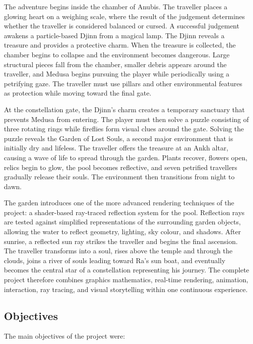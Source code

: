 \documentclass[11pt,a4paper]{article}
\begin{document}
The adventure begins inside the chamber of Anubis. The traveller places a
glowing heart on a weighing scale, where the result of the judgement determines
whether the traveller is considered balanced or cursed. A successful judgement
awakens a particle-based Djinn from a magical lamp. The Djinn reveals a
treasure and provides a protective charm. When the treasure is collected, the
chamber begins to collapse and the environment becomes dangerous. Large
structural pieces fall from the chamber, smaller debris appears around the
traveller, and Medusa begins pursuing the player while periodically using a
petrifying gaze. The traveller must use pillars and other environmental
features as protection while moving toward the final gate.

At the constellation gate, the Djinn's charm creates a temporary sanctuary
that prevents Medusa from entering. The player must then solve a puzzle
consisting of three rotating rings while fireflies form visual clues around the
gate. Solving the puzzle reveals the Garden of Lost Souls, a second major
environment that is initially dry and lifeless. The traveller offers the
treasure at an Ankh altar, causing a wave of life to spread through the garden.
Plants recover, flowers open, relics begin to glow, the pool becomes reflective,
and seven petrified travellers gradually release their souls. The environment
then transitions from night to dawn.

The garden introduces one of the more advanced rendering techniques of the
project: a shader-based ray-traced reflection system for the pool. Reflection
rays are tested against simplified representations of the surrounding garden
objects, allowing the water to reflect geometry, lighting, sky colour, and
shadows. After sunrise, a reflected sun ray strikes the traveller and begins
the final ascension. The traveller transforms into a soul, rises above the
temple and through the clouds, joins a river of souls leading toward Ra's sun
boat, and eventually becomes the central star of a constellation representing
his journey. The complete project therefore combines graphics mathematics,
real-time rendering, animation, interaction, ray tracing, and visual
storytelling within one continuous experience.

\subsection{Objectives}

The main objectives of the project were:
\end{document}
